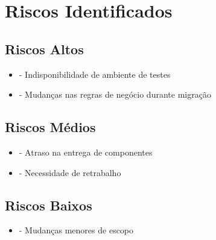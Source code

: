 \section{Riscos Identificados}

\subsection{Riscos Altos}
\begin{itemize}
\item {} - Indisponibilidade de ambiente de testes
\item {} - Mudanças nas regras de negócio durante migração
\end{itemize}

\subsection{Riscos Médios}
\begin{itemize}
\item {} - Atraso na entrega de componentes
\item {} - Necessidade de retrabalho
\end{itemize}

\subsection{Riscos Baixos}
\begin{itemize}
\item {} - Mudanças menores de escopo
\end{itemize}
